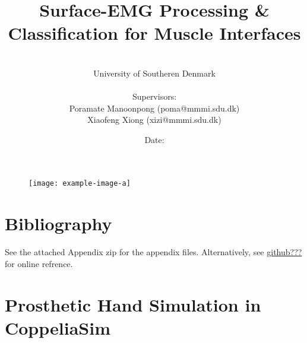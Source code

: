 \documentclass[a4paper, 12pt]{article}
\title{\textbf{Surface-EMG Processing \& Classification for Muscle Interfaces}}
\author{
\\University of Southeren Denmark
\\
\\Supervisors: 
\\Poramate Manoonpong (poma@mmmi.sdu.dk)
\\Xiaofeng Xiong (xizi@mmmi.sdu.dk)
}
\date{Date: }
\begin{document}
\maketitle
\begin{figure}[h]
\begin{center}
\texttt{[image: example-image-a]}
\end{center}
\end{figure}
\newpage


\newpage


\newpage


\newpage

\tableofcontents
\newpage


\newpage

\newpage

\newpage

\newpage

\newpage

\newpage

\newpage

\section{Bibliography}
\listoffigures
\listoftables
\newpage

\printbibliography

\newpage

\listofappendices  %
\appendix %


See the attached Appendix zip for the appendix files. 
Alternatively, see \url{github???} for online refrence.

\section{Prosthetic Hand Simulation in CoppeliaSim}
\label{appendix:handsim}
\end{document}
